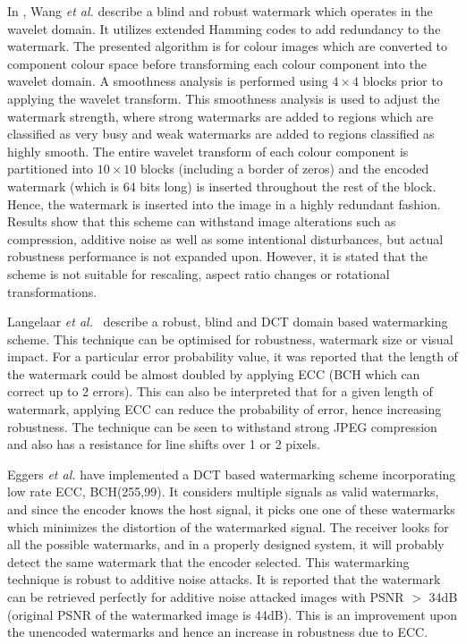 \documentclass[12pt]{report}
\begin{document}
In \cite{ECCb4:wang}, Wang \emph{et al.} describe a blind and robust watermark which 
operates in the wavelet domain. It utilizes extended
Hamming codes to add redundancy to the watermark. The presented algorithm is for colour images which are converted to
component colour space before transforming each colour component into the wavelet domain. A smoothness analysis is 
performed using $4 \times 4$ blocks prior to applying the wavelet transform. This smoothness 
analysis is used to adjust the watermark strength, where strong watermarks are added to regions which are classified
as very busy and weak watermarks are added to regions classified as highly smooth. 
The entire wavelet transform of each colour component is partitioned into
$10 \times 10$ blocks (including a border of zeros) and the encoded watermark (which is 64 bits long) is inserted 
throughout the rest of the block. Hence, the watermark is inserted into the image in a highly redundant fashion. 
Results show that this scheme can withstand image alterations
such as compression, additive noise as well as some intentional disturbances, but actual robustness performance 
is not expanded upon.
However, it is stated that the scheme is not
suitable for rescaling, aspect ratio changes or rotational transformations. 

Langelaar \emph{et al.}~\cite{ECCb4:lang} describe a robust, blind and DCT domain based watermarking scheme. This 
technique can be optimised for robustness, watermark size or visual impact.  
For a particular error probability value, it was reported that the length of the watermark could be almost doubled by
applying ECC (BCH which can correct up to 2 errors). 
This can also be interpreted that for a given length of watermark,
applying ECC can reduce the probability of error, hence increasing robustness.
The technique can be seen to withstand strong JPEG compression and also has a resistance for line shifts over 1 or 2
pixels.

Eggers \emph{et al.} \cite{ECCb4:egg1} have implemented a DCT based watermarking scheme incorporating low rate ECC, BCH(255,99).
It considers multiple signals as valid watermarks, and since the encoder knows the host signal, it picks one one of these 
watermarks which minimizes the distortion of the watermarked signal. The receiver looks for all the possible watermarks,
and in a properly designed system, it will probably detect the same watermark that the encoder selected.
This watermarking technique is robust to additive noise attacks. 
It is reported that the watermark can 
be retrieved perfectly for additive noise attacked images with PSNR $>$ 34dB (original PSNR of the watermarked image is 44dB).
This is an improvement upon the unencoded watermarks and hence an increase in robustness due to ECC. 
\end{document}

